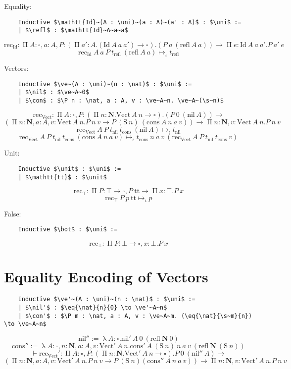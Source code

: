 \documentclass[en]{myarticle}
\renewcommand{\mathtt}{\mathrm}
\newcommand{\uni}[1][]{\square_{#1}}
\newcommand{\red}{\mapsto}
\newcommand{\ired}{\red_\iota}
\renewcommand{\P}{\operatorname{\Pi}}
\newcommand{\unit}{\top}
\DeclareMathOperator{\?}{?}
\renewcommand{\l}{\operatorname{\lambda}}
\newcommand{\rec}{\mathtt{rec}}
\newcommand{\nat}{\mathbf{N}}
\newcommand{\s}{\mathtt{S}}
\newcommand{\eq}[3]{\mathtt{Id}_{#1}~#2~#3}
\newcommand{\refl}{\mathtt{refl}}
\newcommand{\ve}{\mathtt{Vect}}
\newcommand{\nil}{\mathtt{nil}}
\newcommand{\con}{\mathtt{cons}}
\begin{document}
{	Equality:
	\begin{lstlisting}
	Inductive $\mathtt{Id}~(A : \uni)~(a : A)~(a' : A)$ : $\uni$ :=
	| $\refl$ : $\mathtt{Id}~A~a~a$
	\end{lstlisting}
	\[\rec_{\mathtt{Id}} : \P A : \uni, a : A, P : (\P a' : A. (\mathtt{Id}~A~a~a') \to \uni). (P~a~(\refl~A~a)) \to \P e : \mathtt{Id}~A~a~a'. P~a'~e \]
	\[\rec_{\mathtt{Id}}~A~a~P~t_{\refl}~(\refl~A~a) \ired t_{\refl} \]
	
	Vectors:
	\begin{lstlisting}
	Inductive $\ve~(A : \uni)~(n : \nat)$ : $\uni$ :=
	| $\nil$ : $\ve~A~0$
	| $\con$ : $\P n : \nat, a : A, v : \ve~A~n. \ve~A~(\s~n)$
	\end{lstlisting}
	\[\rec_{\ve} : \P A : \uni, P : (\P n : \nat. \ve~A~n \to \uni). (P~0~(\nil~A)) \to\]
	\[(\P n : \nat, a : A, v : \ve~A~n. P~n~v \to P~(\s~n)~(\con~A~n~a~v)) \to \P n : \nat, v : \ve~A~n. P~n~v  \]
	\[\rec_{\ve}~A~P~t_{\nil}~t_{\con}~(\nil~A) \ired t_{\nil} \]
	\[\rec_{\ve}~A~P~t_{\nil}~t_{\con}~(\con~A~n~a~v) \ired t_{\con}~n~a~v~(\rec_{\ve}~A~P~t_{\nil}~t_{\con}~v) \]
	
	Unit:
	\begin{lstlisting}
	Inductive $\unit$ : $\uni$ :=
	| $\mathtt{tt}$ : $\unit$
	\end{lstlisting}
	\[\rec_{\unit} : \P P : \unit \to \uni, P~\mathtt{tt} \to \P x : \unit. P~x \]
	\[\rec_{\unit}~P~p~\mathtt{tt} \ired p \]
	
	False:
	\begin{lstlisting}
	Inductive $\bot$ : $\uni$ :=
	\end{lstlisting}
	\[\rec_{\bot} : \P P : \bot \to \uni, x : \bot. P~x \]

\section{Equality Encoding of Vectors}
\label{vecid}

	\begin{lstlisting}
	Inductive $\ve'~(A : \uni)~(n : \nat)$ : $\uni$ :=
	| $\nil'$ : $\eq{\nat}{n}{0} \to \ve'~A~n$
	| $\con'$ : $\P m : \nat, a : A, v : \ve~A~m. (\eq{\nat}{\s~m}{n}) \to \ve~A~n$
	\end{lstlisting}
	\[\nil'' := \l A : \uni . \nil'~A~0~(\refl~\nat~0) \]
	\[\con'' := \l A : \uni, n : \nat, a : A, v : \ve'~A~n . \con'~A~(\s~n)~n~a~v~(\refl~\nat~(\s~n))\]
	\[\vdash \rec_{\ve}' : \P A : \uni, P : (\P n : \nat. \ve'~A~n \to \uni) . P~0~(\nil''~A) \to\]
	\[(\P n : \nat, a : A, v : \ve'~A~n. P~n~v \to P~(\s~n) (\con''~A~n~a~v)) \to \P n : \nat, v : \ve'~A~n. P~n~v \]

}
\end{document}
